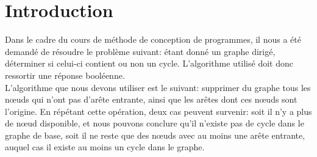 
\section{Introduction}
Dans le cadre du cours de méthode de conception de programmes, il nous a été demandé de résoudre le problème suivant: étant donné un graphe dirigé, déterminer si celui-ci contient ou non un cycle. L'algorithme utilisé doit donc ressortir une réponse booléenne.\\

L'algorithme que nous devons utiliser est le suivant: supprimer du graphe tous les nœuds qui n'ont pas d'arête entrante, ainsi que les arêtes dont ces nœuds sont l'origine. En répétant cette opération, deux cas peuvent survenir: soit il n'y a plus de nœud disponible, et nous pouvons conclure qu'il n'existe pas de cycle dans le graphe de base, soit il ne reste que des nœuds avec au moins une arête entrante, auquel cas il existe au moins un cycle dans le graphe.

